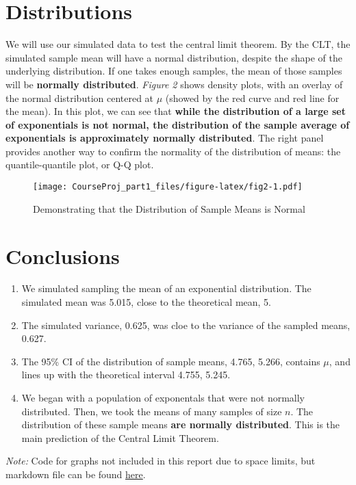 \documentclass[]{article}
\begin{document}
\section{Distributions}\label{distributions}

We will use our simulated data to test the central limit theorem. By the
CLT, the simulated sample mean will have a normal distribution, despite
the shape of the underlying distribution. If one takes enough samples,
the mean of those samples will be \textbf{normally distributed}.
\emph{Figure 2} shows density plots, with an overlay of the normal
distribution centered at \(\mu\) (showed by the red curve and red line
for the mean). In this plot, we can see that \textbf{while the
distribution of a large set of exponentials is not normal, the
distribution of the sample average of exponentials is approximately
normally distributed}. The right panel provides another way to confirm
the normality of the distribution of means: the quantile-quantile plot,
or Q-Q plot.

\begin{figure}[htbp]
\centering
\texttt{[image: CourseProj\_part1\_files/figure-latex/fig2-1.pdf]}
\caption{Demonstrating that the Distribution of Sample Means is Normal}
\end{figure}

\pagebreak 

\section{Conclusions}\label{conclusions}

\begin{enumerate}
\def\labelenumi{\arabic{enumi}.}
\itemsep1pt\parskip0pt
\item
  We simulated sampling the mean of an exponential distribution. The
  simulated mean was 5.015, close to the theoretical mean, 5.\\
\item
  The simulated variance, 0.625, was cloe to the variance of the sampled
  means, 0.627.\\
\item
  The 95\% CI of the distribution of sample means, 4.765, 5.266,
  contains \(\mu\), and lines up with the theoretical interval 4.755,
  5.245.\\
\item
  We began with a population of exponentals that were not normally
  distributed. Then, we took the means of many samples of size \(n\).
  The distribution of these sample means \textbf{are normally
  distributed}. This is the main prediction of the Central Limit
  Theorem.
\end{enumerate}

\emph{Note:} Code for graphs not included in this report due to space
limits, but markdown file can be found
\href{https://github.com/anandi42/Stat_Inf/blob/master/CourseProj_part1.Rmd}{here}.
\end{document}
